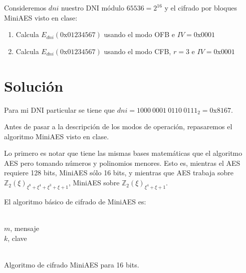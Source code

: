 	Consideremos $dni$ nuestro DNI módulo $65536 = 2^{16}$ y el cifrado por bloques MiniAES visto en clase:
	\begin{enumerate}
		\item Calcula $E_{dni}(\mathrm{0x01234567})$ usando el modo OFB e $IV = \mathrm{0x0001}$
		\item Calcula $E_{dni}(\mathrm{0x01234567})$ usando el modo CFB, $r = 3$ e $IV = \mathrm{0x0001}$
	\end{enumerate}
\section*{Solución}
	Para mi DNI particular se tiene que $dni = 1000\ 0001\ 0110\ 0111_2 = \mathrm{0x8167}$.
	
	Antes de pasar a la descripción de los modos de operación, repasaremos el algoritmo MiniAES visto en clase.
	
	Lo primero es notar que tiene las mismas bases matemáticas que el algoritmo AES pero tomando números y
	polinomios menores. Esto es, mientras el AES requiere 128 bits, MiniAES sólo 16 bits, y mientras que AES
	trabaja sobre $\mathbb{Z}_2(\xi)_{\xi^8+\xi^4+\xi^3+\xi+1}$, MiniAES sobre $\mathbb{Z}_2(\xi)_{\xi^4+\xi+1}$.
	
	El algoritmo básico de cifrado de MiniAES es:
	\begin{algorithm}[H]
		\begin{algorithmic}[1]
			\REQUIRE \ \\
				\texttt{$m$}, mensaje \\
				\texttt{$k$}, clave\\ \

		\end{algorithmic}
		\caption{Algoritmo de cifrado MiniAES para 16 bits.}
		\label{EncMiniAES}
	\end{algorithm}
	

